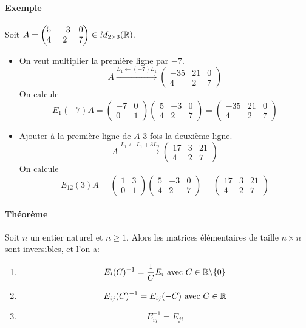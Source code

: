 \paragraph{Exemple} Soit $A = \begin{pmatrix} 5 & -3 & 0 \\ 4 & 2 & 7 \end{pmatrix} \in M_{2 \times 3}(\mathbb{R})$. 
\begin{itemize}
  \item On veut multiplier la première ligne par $-7$.
    $$A \xrightarrow {L_1 \leftarrow (-7)L_1} 
    \begin{pmatrix} -35 & 21 & 0 \\ 4 & 2 & 7 \end{pmatrix}$$
    On calcule
    $$E_1(-7) A 
      = \begin{pmatrix} -7 & 0 \\ 0 & 1 \end{pmatrix} \begin{pmatrix} 5 & -3 & 0 \\ 4 & 2 & 7 \end{pmatrix} 
      = \begin{pmatrix} -35 & 21 & 0 \\ 4 & 2 & 7 \end{pmatrix}$$

  \item Ajouter à la première ligne de $A$ $3$ fois la deuxième ligne.
    $$A \xrightarrow{L_1\leftarrow L_1+3L_2} 
      \begin{pmatrix} 17 & 3 & 21 \\ 4 & 2 & 7 \end{pmatrix}$$
    On calcule
    $$E_{1 2}(3) A 
      = \begin{pmatrix} 1 & 3 \\ 0 & 1 \end{pmatrix} \begin{pmatrix} 5 & -3 & 0 \\ 4 & 2 & 7 \end{pmatrix} 
      = \begin{pmatrix} 17 & 3 & 21 \\ 4 & 2 & 7 \end{pmatrix}$$
\end{itemize}

\paragraph{Théorème} Soit $n$ un entier naturel et $n \geq 1$. Alors les matrices élémentaires de taille $n \times n$ sont inversibles, et l'on a:
\begin{enumerate}
  \item $$E_i(C)^{-1} = \frac{1}{C} E_i \text{ avec } C \in \mathbb{R} \backslash \{ 0 \}$$
  \item $$E_{i j}(C)^{-1} = E_{i j}(-C) \text{ avec } C \in \mathbb{R}$$
  \item $$E_{i j}^{-1} = E_{j i}$$
\end{enumerate}

